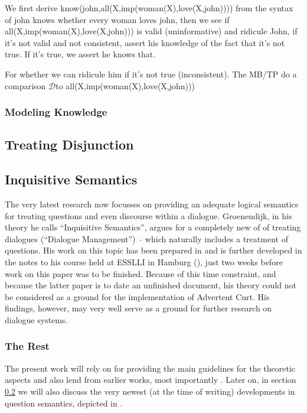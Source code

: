 \documentclass[11pt,a4paper]{article}
\newcommand{\pn}{\textsf} %
\newcommand{\Disc}{\ensuremath{\mathcal{D}}} %
\newcommand{\acurt}{\pn{Advertent Curt}}
\theoremstyle{remark}
\theoremstyle{remark}
\theoremstyle{definition}
\begin{document}
We first derive know(john,all(X,imp(woman(X),love(X,john)))) from the syntax of
john knows whether every woman loves john, then we see if
all(X,imp(woman(X),love(X,john))) is valid (uninformative) and ridicule John, if
it's not valid and not consistent, assert his knowledge of the fact that it's
not true. If it's true, we assert he knows that.

For whether we can ridicule him if it's not true (inconsistent).
The MB/TP do a comparison \Disc to all(X,imp(woman(X),love(X,john)))

\subsubsection{Modeling Knowledge}\label{sec:epistemic}

\subsection{Treating Disjunction}

\subsection{Inquisitive Semantics}\label{sec:altq}

The very latest research now focusses on providing an adequate logical semantics
for treating questions and even discourse within a dialogue. Groenendijk, in his
theory he calls ``Inquisitive Semantics'', argues for a completely new of of
treating dialogues (``Dialogue Management'') -- which naturally includes a
treatment of questions. His work on this topic has been prepared in \cite{g:is}
and is further developed in the notes to his course held at ESSLLI in Hamburg
(\cite{g:isdm}), just two weeks before work on this paper was to be finished.
Because of this time constraint, and because the latter paper is to date an
unfinished document, his theory could not be considered as a ground for the
implementation of \acurt. His findings, however, may very well serve as a ground
for further research on dialogue systems.

\subsubsection{The Rest}


The present work will rely on \cite{gs:q} for providing the main guidelines for
the theoretic aspects and also lend from earlier works, most importantly
\cite{gs:sqpa}\footnotemark. Later on, in section \ref{sec:altq} we will also
discuss the very newest (at the time of writing) developments in question
semantics, depicted in \cite{g:is}.
\end{document}

